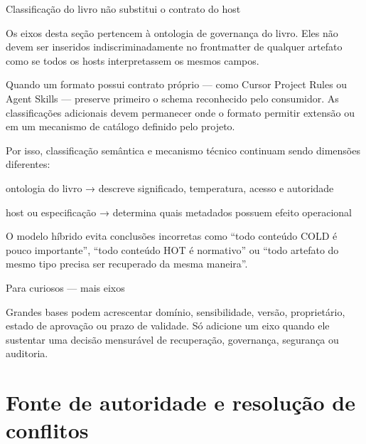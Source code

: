 \documentclass[
  10pt,
  a4paper,
  oneside]{book}
\newenvironment{Shaded}{}{}
\newcommand{\NormalTok}[1]{#1}
\renewenvironment{Shaded}{\begin{snugshade}}{\end{snugshade}}%
\begin{document}
\begin{warningbox}{Classificação do livro não substitui o contrato do host}

Os eixos desta seção pertencem à ontologia de governança do livro. Eles
não devem ser inseridos indiscriminadamente no frontmatter de qualquer
artefato como se todos os hosts interpretassem os mesmos campos.

Quando um formato possui contrato próprio --- como Cursor Project Rules
ou Agent Skills --- preserve primeiro o schema reconhecido pelo
consumidor. As classificações adicionais devem permanecer onde o formato
permitir extensão ou em um mecanismo de catálogo definido pelo projeto.

\end{warningbox}

Por isso, classificação semântica e mecanismo técnico continuam sendo
dimensões diferentes:

\begin{Shaded}
\begin{Highlighting}[]
\NormalTok{ontologia do livro}
\NormalTok{→ descreve significado, temperatura, acesso e autoridade}

\NormalTok{host ou especificação}
\NormalTok{→ determina quais metadados possuem efeito operacional}
\end{Highlighting}
\end{Shaded}

O modelo híbrido evita conclusões incorretas como ``todo conteúdo COLD é
pouco importante'', ``todo conteúdo HOT é normativo'' ou ``todo artefato
do mesmo tipo precisa ser recuperado da mesma maneira''.

\begin{curiousbox}{Para curiosos — mais eixos}

Grandes bases podem acrescentar domínio, sensibilidade, versão,
proprietário, estado de aprovação ou prazo de validade. Só adicione um
eixo quando ele sustentar uma decisão mensurável de recuperação,
governança, segurança ou auditoria.

\end{curiousbox}

\hypertarget{fonte-de-autoridade-e-resoluuxe7uxe3o-de-conflitos}{%
\section{Fonte de autoridade e resolução de
conflitos}\label{fonte-de-autoridade-e-resoluuxe7uxe3o-de-conflitos}}
\end{document}
